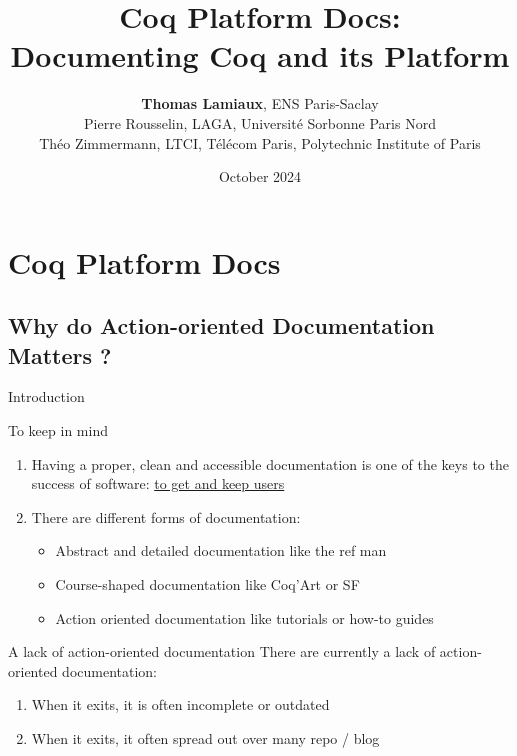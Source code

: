 \documentclass[10pt]{beamer}
\title{Coq Platform Docs: \\ Documenting Coq and its Platform}
\author{\textbf{Thomas Lamiaux}, ENS Paris-Saclay \\
Pierre Rousselin, LAGA, Université Sorbonne Paris Nord \\
Théo Zimmermann, LTCI, Télécom Paris, Polytechnic Institute of Paris }
\date{October 2024}
\begin{document}
\begin{frame}
    \maketitle
\end{frame}


\section*{Coq Platform Docs}

\subsection{Why do Action-oriented Documentation Matters ?}

\begin{frame}{Introduction}
  \begin{tcbProp}{To keep in mind}
    \begin{enumerate}
      \item Having a proper, clean and accessible documentation is one of the
            keys to the success of software: \ul{to get and keep users}
      \item<2-> There are different forms of documentation:
      \begin{itemize}[label=$-$]
        \item Abstract and detailed documentation like the ref man
        \item Course-shaped documentation like Coq'Art or SF
        \item Action oriented documentation like tutorials or how-to guides
      \end{itemize}
    \end{enumerate}
  \end{tcbProp}
  \begin{tcbPbl}{A lack of action-oriented documentation }
    There are currently a lack of action-oriented documentation:
    \begin{enumerate}
      \item When it exits, it is often incomplete or outdated
      \item When it exits, it often spread out over many repo / blog
    \end{enumerate}
  \end{tcbPbl}
\end{frame}
\end{document}
